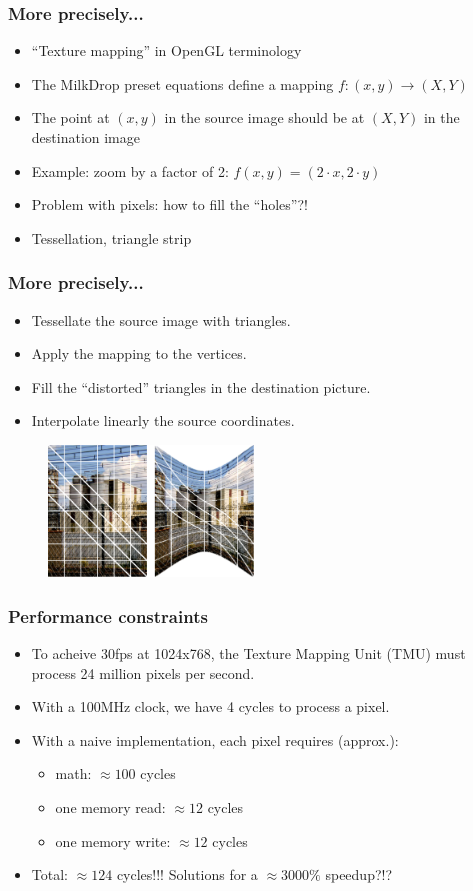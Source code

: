 \documentclass{beamer}
\begin{document}
\frame
{
  \frametitle{More precisely...}
  
  \begin{itemize}
  \item ``Texture mapping'' in OpenGL terminology
  \item The MilkDrop preset equations define a mapping $f : (x,y)\rightarrow(X,Y)$
  \item The point at $(x,y)$ in the source image should be at $(X,Y)$ in the destination image
  \item Example: zoom by a factor of 2: $f(x,y) = (2 \cdot x, 2 \cdot y)$
  \item Problem with pixels: how to fill the ``holes''?!
  \item Tessellation, triangle strip
  \end{itemize}
}

\frame
{
  \frametitle{More precisely...}
  \begin{itemize}
  \item Tessellate the source image with triangles.
  \item Apply the mapping to the vertices.
  \item Fill the ``distorted'' triangles in the destination picture.
  \item Interpolate linearly the source coordinates.
  \end{itemize}
  
  \begin{figure}[H]
  \includegraphics[height=35mm]{tesselsanofi.eps}
  \end{figure}
}

\frame
{
  \frametitle{Performance constraints}
  
  \begin{itemize}
  \item To acheive 30fps at 1024x768, the Texture Mapping Unit (TMU) must process 24 million pixels per second.
  \item With a 100MHz clock, we have 4 cycles to process a pixel.
  \item With a naive implementation, each pixel requires (approx.):
  \begin{itemize}
  \item math: $\approx100$ cycles
  \item one memory read: $\approx12$ cycles
  \item one memory write: $\approx12$ cycles
  \end{itemize}
  \item Total: $\approx124$ cycles!!! Solutions for a $\approx3000\%$ speedup?!?
  \end{itemize}
}
\end{document}
